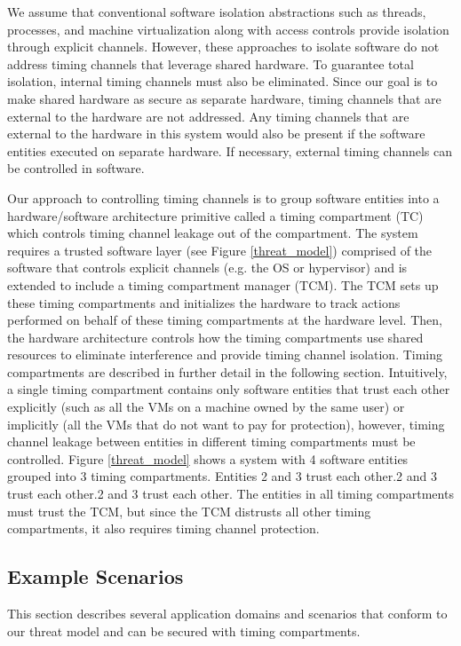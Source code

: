 We assume that conventional software isolation abstractions such as threads, 
processes, and machine virtualization along with access controls provide 
isolation through explicit channels. However, these approaches to isolate 
software do not address timing channels that leverage shared hardware. To 
guarantee total isolation, internal timing channels must also be eliminated.  
Since our goal is to make shared hardware as secure as separate hardware, 
timing channels that are external to the hardware are not addressed. Any timing 
channels that are external to the hardware in this system would also be present 
if the software entities executed on separate hardware. If necessary, external 
timing channels can be controlled in software.

Our approach to controlling timing channels is to group software entities
into a hardware/software architecture primitive called a timing compartment 
(TC) which controls timing channel leakage out of the compartment. The system 
requires a trusted software layer (see Figure \ref{threat_model}) comprised of 
the software that controls explicit channels (e.g.  the OS or hypervisor) and 
is extended to include a timing compartment manager (TCM). The TCM sets up 
these timing compartments and initializes the hardware to track actions 
performed on behalf of these timing compartments at the hardware level. Then, 
the hardware architecture controls how the timing compartments use shared 
resources to eliminate interference and provide timing channel isolation.  
Timing compartments are described in further detail in the following section.  
Intuitively, a single timing compartment contains only software entities that 
trust each other explicitly (such as all the VMs on a machine owned by the same 
user) or implicitly (all the VMs that do not want to pay for protection), 
however, timing channel leakage between entities in different timing 
compartments must be controlled. Figure \ref{threat_model} shows a system with 
4 software entities grouped into 3 timing compartments. Entities 2 and 3 trust 
each other.2 and 3 trust each other.2 and 3 trust each other. The entities in 
all timing compartments must trust the TCM, but since the TCM distrusts all 
other timing compartments, it also requires timing channel protection.

\subsection{Example Scenarios}
This section describes several application domains and scenarios that conform 
to our threat model and can be secured with timing compartments.
